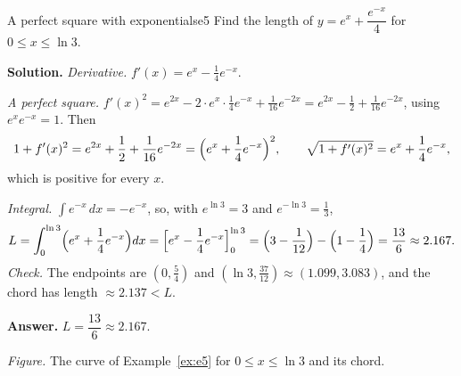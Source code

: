 \documentclass[11pt]{article}
\begin{document}
\begin{exmp}{A perfect square with exponentials}{e5}
Find the length of $y=e^x+\dfrac{e^{-x}}4$ for $0\le x\le\ln3$.

\textbf{Solution.} \emph{Derivative.} $f'(x)=e^x-\frac14e^{-x}$.

\emph{A perfect square.} $f'(x)^2=e^{2x}-2\cdot e^x\cdot\frac14e^{-x}+\frac1{16}e^{-2x}=e^{2x}-\frac12+\frac1{16}e^{-2x}$, using $e^xe^{-x}=1$. Then
\[
1+f'(x)^2=e^{2x}+\frac12+\frac1{16}e^{-2x}=\Bigl(e^x+\frac14e^{-x}\Bigr)^2,\qquad\sqrt{1+f'(x)^2}=e^x+\frac14e^{-x},
\]
which is positive for every $x$.

\emph{Integral.} $\int e^{-x}\,dx=-e^{-x}$, so, with $e^{\ln3}=3$ and $e^{-\ln3}=\frac13$,
\[
L=\int_0^{\ln3}\Bigl(e^x+\frac14e^{-x}\Bigr)dx=\Bigl[e^x-\frac14e^{-x}\Bigr]_0^{\ln3}=\Bigl(3-\frac1{12}\Bigr)-\Bigl(1-\frac14\Bigr)=\frac{13}6\approx2.167 .
\]
\emph{Check.} The endpoints are $(0,\frac54)$ and $(\ln3,\frac{37}{12})\approx(1.099,3.083)$, and the chord has length $\approx2.137<L$.

\textbf{Answer.} $L=\dfrac{13}6\approx2.167$.
\begin{center}
\par\small\emph{Figure.} The curve of Example~\ref{ex:e5} for $0\le x\le\ln3$ and its chord.
\end{center}
\end{exmp}
\end{document}
